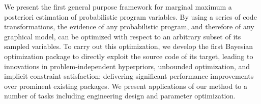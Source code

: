 
We present the first general purpose framework for marginal maximum a posteriori estimation of probabilistic program variables. By using a series of code transformations, the evidence of any probabilistic program, and therefore of any graphical model, can be optimized with respect to an arbitrary subset of its sampled variables.  To carry out this optimization, we develop the first Bayesian optimization package to directly exploit the source code of its target, leading to innovations in problem-independent hyperpriors, unbounded optimization, and implicit constraint satisfaction; delivering significant performance improvements over prominent existing packages.  We present applications of our method to a number of tasks including engineering design and parameter optimization.